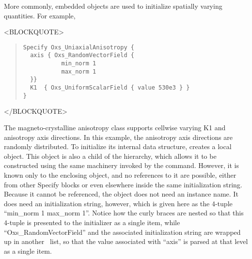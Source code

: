 More commonly, embedded  objects are used to initialize
spatially varying quantities.  For
example,
\begin{rawhtml}
<BLOCKQUOTE>
\end{rawhtml}
\begin{quote}
\begin{verbatim}
Specify Oxs_UniaxialAnisotropy {
  axis { Oxs_RandomVectorField {
           min_norm 1
           max_norm 1
  }}
  K1  { Oxs_UniformScalarField { value 530e3 } }
}
\end{verbatim}
\end{quote}
\begin{rawhtml}
</BLOCKQUOTE>
\end{rawhtml}
\sloppy
The magneto-crystalline anisotropy class 
supports cellwise varying K1 and anisotropy axis directions.  In this
example, the anisotropy axis directions are randomly distributed.  To
initialize its internal data structure, 
creates a local  object.  This object is
also a child of the  hierarchy, which allows it to be
constructed using the same machinery invoked by the 
command.  However, it is known only to the enclosing
 object, and no references to it are
possible, either from other Specify blocks or even elsewhere inside
the same initialization string.  Because it cannot be referenced, the
object does not need an instance name.  It does need an initialization
string, however, which is given here as the 4-tuple ``min\_norm 1
max\_norm 1''.  Notice how the curly braces are nested so that this
4-tuple is presented to the  initializer as a
single item, while ``Oxs\_RandomVectorField'' and the associated
initialization string are wrapped up in another \Tcl\ list, so that the
value associated with ``axis'' is parsed at that level as a single item.

